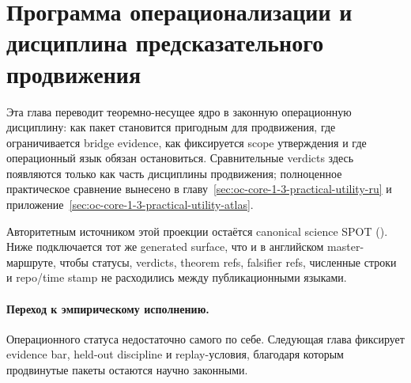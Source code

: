 \section{Программа операционализации и дисциплина предсказательного продвижения}
\label{sec:oc-core-1-3-operationalization-program-ru}

Эта глава переводит теоремно-несущее ядро в законную операционную дисциплину:
как пакет становится пригодным для продвижения, где ограничивается bridge
evidence, как фиксируется scope утверждения и где операционный язык обязан
остановиться. Сравнительные verdicts здесь появляются только как часть
дисциплины продвижения; полноценное практическое сравнение вынесено в
главу~\ref{sec:oc-core-1-3-practical-utility-ru} и
приложение~\ref{sec:oc-core-1-3-practical-utility-atlas}.

Авторитетным источником этой проекции остаётся canonical science SPOT
(). Ниже подключается тот же generated
surface, что и в английском master-маршруте, чтобы статусы, verdicts, theorem
refs, falsifier refs, численные строки и repo/time stamp не расходились между
публикационными языками.

\begingroup
\small

\endgroup

\paragraph{Переход к эмпирическому исполнению.}
Операционного статуса недостаточно самого по себе. Следующая глава фиксирует
evidence bar, held-out discipline и replay-условия, благодаря которым
продвинутые пакеты остаются научно законными.
